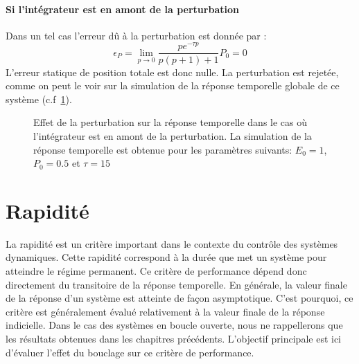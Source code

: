 \paragraph{Si l'intégrateur est en amont de la perturbation}
Dans un tel cas l'erreur dû à la perturbation est donnée par :
\[
\epsilon_P=\lim\limits_{p\to0}\dfrac{pe^{-\tau p}}{p(p+1)+1}P_0=0
\]
L'erreur statique de position totale est donc nulle. La perturbation
est rejetée, comme on peut le voir sur la simulation de la réponse
temporelle globale de ce système (c.f~\cref{fig-pert2}).
\begin{figure}[!h]
    \centering
    
    \caption{Effet de la perturbation sur la réponse temporelle dans le cas
             où l'intégrateur est en amont de la perturbation. La simulation
             de la réponse temporelle est obtenue pour les paramètres suivants: 
             $E_0=1$, $P_0=0.5$ et $\tau=15$\label{fig-pert2}}
\end{figure}
\clearpage
\section{Rapidité\label{sec-rapidite}}
La rapidité est un critère important dans le contexte du contrôle des 
systèmes dynamiques. Cette rapidité correspond à la durée que met un 
système pour atteindre le régime permanent. Ce critère de performance 
dépend donc directement du transitoire de la réponse temporelle. 
En générale, la valeur finale de la réponse d'un système est atteinte de 
façon asymptotique. C'est pourquoi, ce critère est généralement évalué 
relativement à la valeur finale de la réponse indicielle. 
Dans le cas des systèmes en boucle ouverte, nous ne rappellerons que les 
résultats obtenues dans les chapitres précédents. 
L'objectif principale est ici d'évaluer l'effet du bouclage sur ce critère 
de performance.
